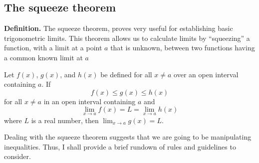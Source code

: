 \documentclass{report}
\begin{document}
      \subsection{The squeeze theorem}
      \bigbreak \noindent 
      \textbf{Definition.} The squeeze theorem, proves very useful for establishing basic trigonometric limits. This theorem allows us to calculate limits by “squeezing” a function, with a limit at a point $a$ that is unknown, between two functions having a common known limit at $a$
      \bigbreak \noindent 
      \begin{thrm}
       Let \( f(x) \), \( g(x) \), and \( h(x) \) be defined for all \( x \neq a \) over an open interval containing \( a \). If
      \[ f(x) \leq g(x) \leq h(x) \]
      for all \( x \neq a \) in an open interval containing \( a \) and
      \[ \lim_{x \to a} f(x) = L = \lim_{x \to a} h(x) \]
      where \( L \) is a real number, then \( \lim_{x \to a} g(x) = L \).
      \end{thrm}
      \bigbreak \noindent 
      Dealing with the squeeze theorem suggests that we are going to be manipulating inequalities. Thus, I shall provide a brief rundown of rules and guidelines to consider.
      \bigbreak \noindent 
\end{document}
